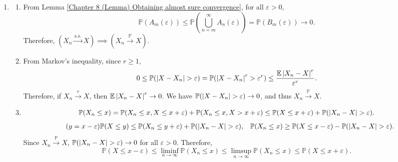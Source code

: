 \documentclass{huhtakm-template-book-v2}
\newcommand{\prob}{\mathbb{P}}
\newcommand{\expect}{\mathbb{E}}
\begin{document}
    \begin{proofing}
        \begin{enumerate}
            \item \begin{enumerate}
                \item From Lemma \ref{Chapter 8 (Lemma) Obtaining almost sure convergence}, for all $\varepsilon > 0$,
                \begin{equation*}
                    \prob(A_{m}(\varepsilon)) \leq \prob\left(\bigcup_{n = m}^{\infty}A_{n}(\varepsilon)\right) = \prob(B_{m}(\varepsilon)) \to 0.
                \end{equation*}
                Therefore, $(X_{n} \xrightarrow{\text{a.s.}} X) \implies (X_{n} \xrightarrow{\prob} X)$.
                \item From Markov's inequality, since $r \geq 1$,
                \begin{equation*}
                    0 \leq \prob(\abs{X-X_{n}} > \varepsilon) = \prob(\abs{X-X_{n}}^{r} > \varepsilon^{r}) \leq \frac{\expect\abs{X_{n}-X}^{r}}{\varepsilon^{r}}.
                \end{equation*}
                Therefore, if $X_{n} \xrightarrow{r} X$, then $\expect\abs{X_{n}-X}^{r} \to 0$. We have $\prob(\abs{X-X_{n}} > \varepsilon) \to 0$, and thus $X_{n} \xrightarrow{\prob} X$.
                \item 
                \begin{equation*}
                    \prob(X_{n} \leq x) = \prob(X_{n} \leq x,X \leq x+\varepsilon)+\prob(X_{n} \leq x,X > x+\varepsilon) \leq \prob(X \leq x+\varepsilon)+\prob(\abs{X_{n}-X} > \varepsilon).
                \end{equation*}
                \begin{align*}
                    \tag{$y = x-\varepsilon$}
                    \prob(X \leq y) &\leq \prob(X_{n} \leq y+\varepsilon)+\prob(\abs{X_{n}-X} > \varepsilon), & \prob(X_{n} \leq x) &\geq \prob(X \leq x-\varepsilon)-\prob(\abs{X_{n}-X} > \varepsilon).
                \end{align*}
                Since $X_{n} \xrightarrow{\prob} X$, $\prob(\abs{X_{n}-X} > \varepsilon) \to 0$ for all $\varepsilon > 0$. Therefore,
                \begin{equation*}
                    \prob(X \leq x-\varepsilon) \leq \liminf_{n \to \infty}\prob(X_{n} \leq x) \leq \limsup_{n \to \infty}\prob(X_{n} \leq x) \leq \prob(X \leq x+\varepsilon).
                \end{equation*}

\end{enumerate}
\end{enumerate}
\end{proofing}
\end{document}
